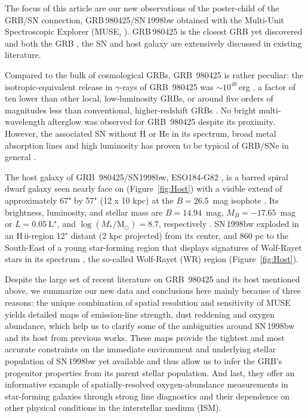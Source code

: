 \documentclass[traditabstract]{aa}
\newcommand{\hii}{\mbox{H\,{\sc ii}}}
\begin{document}
The focus of this article are our new observations of the poster-child of the GRB/SN connection, GRB\,980425/SN\,1998bw obtained with the Multi-Unit Spectroscopic Explorer (MUSE, \citealp{2010SPIE.7735E..08B}). GRB\,980425 is the closest GRB yet discovered and both the GRB \citep[e.g.][]{1998Natur.395..670G, 1998Natur.395..663K}, the SN \citep[e.g.][]{1998Natur.395..672I, 2001ApJ...555..900P, 2006ApJ...640..854M} and host galaxy \citep[e.g.][]{2000ApJ...542L..89F, 2005NewA...11..103S, 2006A&A...454..103H, 2009ApJ...693..347M, 2014A&A...562A..70M, 2016arXiv160901742M} are extensively discussed in existing literature. 

Compared to the bulk of cosmological GRBs, GRB~980425 is rather peculiar: the isotropic-equivalent release in $\gamma$-rays of GRB~980425 was $\sim10^{48}$\,erg \citep{1998Natur.395..670G}, a factor of ten lower than other local, low-luminosity GRBs, or around five orders of magnitudes less than conventional, higher-redshift GRBs \citep{2013ApJ...776...98X}. No bright multi-wavelength afterglow was observed for GRB~980425 despite its proximity. However, the associated SN without H or He in its spectrum, broad metal absorption lines and high luminosity has proven to be typical of GRB/SNe in general \citep{2012grbu.book..169H}.

The host galaxy of GRB~980425/SN1998bw, ESO184-G82 \citep{1989spce.book.....L}, is a barred spiral dwarf galaxy \citep{2000ApJ...542L..89F} seen nearly face on (Figure~\ref{fig:Host}) with a visible extend of approximately 67" by 57" (12 x 10 kpc) at the $B=26.5$~mag isophote \citep{2005NewA...11..103S}. Its brightness, luminosity, and stellar mass are $B=14.94$~mag, $M_B=-17.65$~mag or $L=0.05~\mathrm{L}^{\star}$, and $\log (M_{*}/\mathrm{M}_{\odot})= 8.7 $, respectively \citep{2005NewA...11..103S, 2014A&A...562A..70M}. SN\,1998bw exploded in an \hii-region 12" distant (2 kpc projected) from its center, and 860 pc to the South-East of a young star-forming region that displays signatures of Wolf-Rayet stars in its spectrum \citep{2006A&A...454..103H}, the so-called Wolf-Rayet (WR) region (Figure~\ref{fig:Host}).

Despite the large set of recent literature on GRB~980425 and its host mentioned above, we summarize our new data and conclusions here mainly because of three reasons: the unique combination of spatial resolution and sensitivity of MUSE yields detailed maps of emission-line strength, dust reddening and oxygen abundance, which help us to clarify some of the ambiguities around SN\,1998bw and its host from previous works. These maps provide the tightest and most accurate constraints on the immediate environment and underlying stellar population of SN\,1998bw yet available and thus allow us to infer the GRB's progenitor properties from its parent stellar population. And last, they offer an informative example of spatially-resolved oxygen-abundance measurements in star-forming galaxies through strong line diagnostics and their dependence on other physical conditions in the interstellar medium (ISM).
\end{document}
